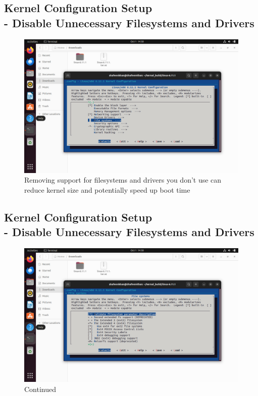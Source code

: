 \documentclass{article}
\begin{document}
\subsection{Kernel Configuration Setup \\-  Disable Unnecessary Filesystems and Drivers}
\begin{figure}[H]
    \centering
    \includegraphics[width=0.8\linewidth]{51.jpg}
    \caption{Removing support for filesystems and drivers you don't use can reduce kernel size and potentially speed up boot time}
\end{figure}

\subsection{Kernel Configuration Setup \\-  Disable Unnecessary Filesystems and Drivers}
\begin{figure}[H]
    \centering
    \includegraphics[width=0.8\linewidth]{50.jpg}
    \caption{Continued}
\end{figure}
\end{document}
